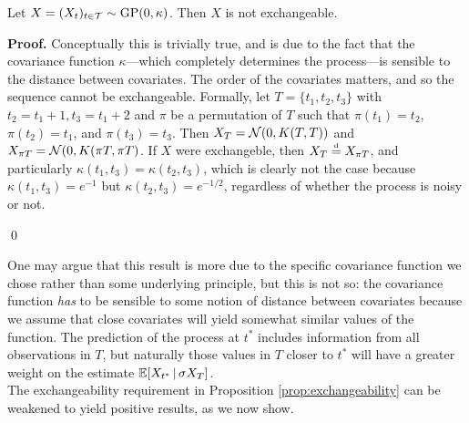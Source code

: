 \begin{proposition} \label{prop:exchangeability}
	Let $X = (X_t)_{t \in \mathcal{T}} \sim \mathrm{GP} (0, \kappa)$. Then $X$ is not exchangeable.
\end{proposition}

\textbf{Proof. \hspace{0.05cm}} Conceptually this is trivially true, and is due to the fact that the covariance function $\kappa$---which completely determines the process---is sensible to the distance between covariates. The order of the covariates matters, and so the sequence cannot be exchangeable. Formally, let $T = \{ t_1, t_2, t_3 \}$ with $t_2 = t_1 + 1, t_3 = t_1 + 2$ and $\pi$ be a permutation of $T$ such that $\pi(t_1) = t_2$,  $\pi(t_2) = t_1$, and $\pi(t_3) = t_3$. Then $X_T = \mathcal{N} (0, K(T, T))$ and $X_{\pi T} = \mathcal{N}(0, K(\pi T, \pi T)$. If $X$ were exchangeble, then $X_T \stackrel{\text{\rm\tiny d}}{=} X_{\pi T}$, and particularly $\kappa(t_1, t_3) = \kappa(t_2, t_3)$, which is clearly not the case because $\kappa(t_1, t_3) = e^{-1}$ but $\kappa(t_2, t_3) = e^{-1/2}$, regardless of whether the process is noisy or not.

\qed

\vskip 0.2cm

One may argue that this result is more due to the specific covariance function we chose rather than some underlying principle, but this is not so: the covariance function \textit{has} to be sensible to some notion of distance between covariates because we assume that close covariates will yield somewhat similar values of the function. The prediction of the process at $t^{*}$ includes information from all observations in $T$, but naturally those values in $T$ closer to $t^{*}$ will have a greater weight on the estimate $\mathbb{E} [X_{t^{*}} \, | \, \sigma X_T ]$. \\


The exchangeability requirement in Proposition \ref{prop:exchangeability} can be weakened to yield positive results, as we now show.



